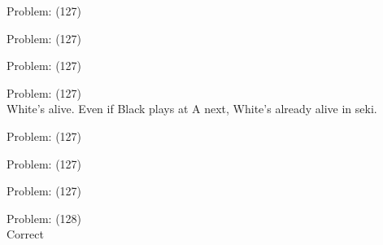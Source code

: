 \documentclass[11pt]{article}
\begin{document}
\begin{minipage}[t]{0.5\textwidth}
  {\centering
  
  Problem: (127)\\
  
  }
\end{minipage}
\begin{minipage}[t]{0.5\textwidth}
  {\centering
  
  Problem: (127)\\
  
  }
\end{minipage}
\begin{minipage}[t]{0.5\textwidth}
  {\centering
  
  Problem: (127)\\
  
  }
\end{minipage}
\begin{minipage}[t]{0.5\textwidth}
  {\centering
  
  Problem: (127)\\
  White's alive. Even if Black plays at A next, White's already alive in seki.\\
  }
\end{minipage}
\begin{minipage}[t]{0.5\textwidth}
  {\centering
  
  Problem: (127)\\
  
  }
\end{minipage}
\begin{minipage}[t]{0.5\textwidth}
  {\centering
  
  Problem: (127)\\
  
  }
\end{minipage}
\begin{minipage}[t]{0.5\textwidth}
  {\centering
  
  Problem: (127)\\
  
  }
\end{minipage}
\begin{minipage}[t]{0.5\textwidth}
  {\centering
  
  Problem: (128)\\
  Correct\\
  }
\end{minipage}
\end{document}
